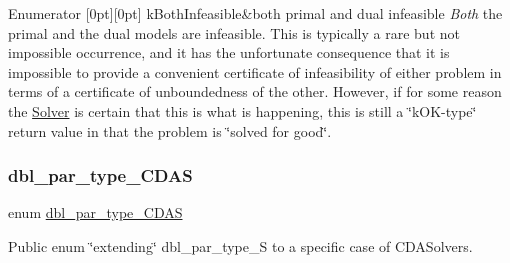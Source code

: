 \begin{DoxyEnumFields}{Enumerator}
[0pt][0pt]{}\mbox{\label{class_s_m_spp__di__unipi__it_1_1_c_d_a_solver_a5c019517747a79f60866b19ce82194bfadba3a97d48d409610a628464526ae573}} 
k\+Both\+Infeasible&both primal and dual infeasible {\itshape Both} the primal and the dual models are infeasible. This is typically a rare but not impossible occurrence, and it has the unfortunate consequence that it is impossible to provide a convenient certificate of infeasibility of either problem in terms of a certificate of unboundedness of the other. However, if for some reason the \mbox{\hyperlink{class_s_m_spp__di__unipi__it_1_1_solver}{Solver}} is certain that this is what is happening, this is still a \char`\"{}k\+O\+K-\/type\char`\"{} return value in that the problem is \char`\"{}solved for good\char`\"{}. \\
\hline

\end{DoxyEnumFields}
\mbox{\label{class_s_m_spp__di__unipi__it_1_1_c_d_a_solver_a12473d2c0cbab01587927c637e3f7e4b}} 
\subsubsection{\texorpdfstring{dbl\+\_\+par\+\_\+type\+\_\+\+C\+D\+AS}{dbl\_par\_type\_CDAS}}
{\footnotesize\ttfamily enum \mbox{\hyperlink{class_s_m_spp__di__unipi__it_1_1_c_d_a_solver_a12473d2c0cbab01587927c637e3f7e4b}{dbl\+\_\+par\+\_\+type\+\_\+\+C\+D\+AS}}}



Public enum \char`\"{}extending\char`\"{} dbl\+\_\+par\+\_\+type\+\_\+S to a specific case of C\+D\+A\+Solvers. 


